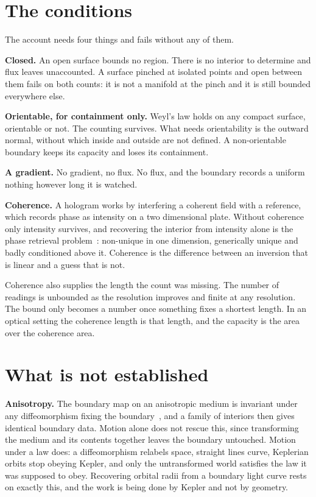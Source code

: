 \section{The conditions}

The account needs four things and fails without any of them.

\textbf{Closed.} An open surface bounds no region. There is no interior to determine and flux leaves unaccounted. A surface pinched at isolated points and open between them fails on both counts: it is not a manifold at the pinch and it is still bounded everywhere else.

\textbf{Orientable, for containment only.} Weyl's law holds on any compact surface, orientable or not. The counting survives. What needs orientability is the outward normal, without which inside and outside are not defined. A non-orientable boundary keeps its capacity and loses its containment.

\textbf{A gradient.} No gradient, no flux. No flux, and the boundary records a uniform nothing however long it is watched.

\textbf{Coherence.} A hologram works by interfering a coherent field with a reference, which records phase as intensity on a two dimensional plate. Without coherence only intensity survives, and recovering the interior from intensity alone is the phase retrieval problem~\cite{src:Bruck-and-Sodin-1979,src:Hayes-1982}: non-unique in one dimension, generically unique and badly conditioned above it. Coherence is the difference between an inversion that is linear and a guess that is not.

Coherence also supplies the length the count was missing. The number of readings is unbounded as the resolution improves and finite at any resolution. The bound only becomes a number once something fixes a shortest length. In an optical setting the coherence length is that length, and the capacity is the area over the coherence area.

\section{What is not established}

\textbf{Anisotropy.} The boundary map on an anisotropic medium is invariant under any diffeomorphism fixing the boundary~\cite{src:Lee-and-Uhlmann-1989}, and a family of interiors then gives identical boundary data. Motion alone does not rescue this, since transforming the medium and its contents together leaves the boundary untouched. Motion under a law does: a diffeomorphism relabels space, straight lines curve, Keplerian orbits stop obeying Kepler, and only the untransformed world satisfies the law it was supposed to obey. Recovering orbital radii from a boundary light curve rests on exactly this, and the work is being done by Kepler and not by geometry.

